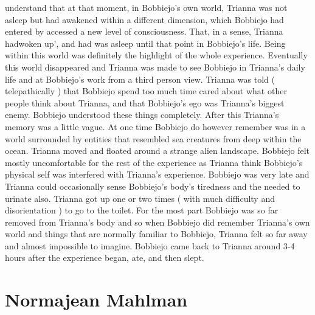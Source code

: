 \documentclass[12pt]{book}
\begin{document}
understand that at that moment, in Bobbiejo's own world, Trianna was not asleep but had awakened within a different dimension, which Bobbiejo had entered by accessed a new level of consciousness. That, in a sense, Trianna hadwoken up', and had was asleep until that point in Bobbiejo's life. Being within this world was definitely the highlight of the whole experience. Eventually this world disappeared and Trianna was made to see Bobbiejo in Trianna's daily life and at Bobbiejo's work from a third person view. Trianna was told ( telepathically ) that Bobbiejo spend too much time cared about what other people think about Trianna, and that Bobbiejo's ego was Trianna's biggest enemy. Bobbiejo understood these things completely. After this Trianna's memory was a little vague. At one time Bobbiejo do however remember was in a world surrounded by entities that resembled sea creatures from deep within the ocean. Trianna moved and floated around a strange alien landscape. Bobbiejo felt mostly uncomfortable for the rest of the experience as Trianna think Bobbiejo's physical self was interfered with Trianna's experience. Bobbiejo was very late and Trianna could occasionally sense Bobbiejo's body's tiredness and the needed to urinate also. Trianna got up one or two times ( with much difficulty and disorientation ) to go to the toilet. For the most part Bobbiejo was so far removed from Trianna's body and so when Bobbiejo did remember Trianna's own world and things that are normally familiar to Bobbiejo, Trianna felt so far away and almost impossible to imagine. Bobbiejo came back to Trianna around 3-4 hours after the experience began, ate, and then slept.



\chapter{Normajean Mahlman}
\end{document}
